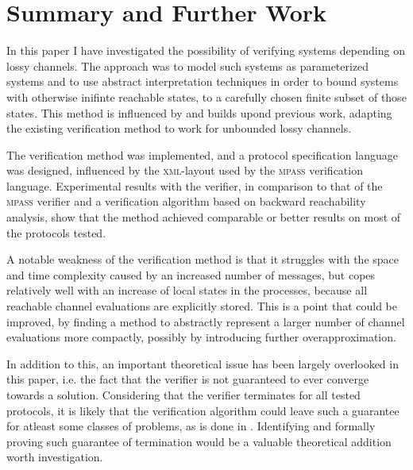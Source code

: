 \section{Summary and Further Work}
In this paper I have investigated the possibility of verifying systems depending on lossy channels. The approach was to model such systems as parameterized systems and to use abstract interpretation techniques in order to bound systems with otherwise inifinte reachable states, to a carefully chosen finite subset of those states. This method is influenced by and builds upond previous work\cite{parosh}, adapting the existing verification method to work for unbounded lossy channels.

The verification method was implemented, and a protocol specification language was designed, influenced by the \textsc{xml}-layout used by the \textsc{mpass} verification language\cite{mpass}. Experimental results with the verifier, in comparison to that of the \textsc{mpass} verifier and a verification algorithm based on backward reachability analysis\cite{287591}, show that the method achieved comparable or better results on most of the protocols tested.

A notable weakness of the verification method is that it struggles with the space and time complexity caused by an increased number of messages, but copes relatively well with an increase of local states in the processes, because all reachable channel evaluations are explicitly stored. This is a point that could be improved, by finding a method to abstractly represent a larger number of channel evaluations more compactly, possibly by introducing further overapproximation.

In addition to this, an important theoretical issue has been largely overlooked in this paper, i.e. the fact that the verifier is not guaranteed to ever converge towards a solution. Considering that the verifier terminates for all tested protocols, it is likely that the verification algorithm could leave such a guarantee for atleast some classes of problems, as is done in \cite{parosh}. Identifying and formally proving such guarantee of termination would be a valuable theoretical addition worth investigation.

